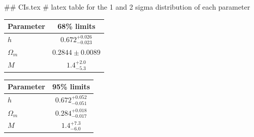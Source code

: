 ## CIs.tex
# latex table for the 1 and 2 sigma distribution of each parameter

\begin{tabular} { l  c}
 Parameter &  68\% limits\\
\hline
{\boldmath$h              $} & $0.672^{+0.026}_{-0.023}   $\\
{\boldmath$\Omega_m       $} & $0.2844\pm 0.0089          $\\
{\boldmath$M              $} & $1.4^{+2.0}_{-5.3}         $\\
\hline
\end{tabular}

\begin{tabular} { l  c}
 Parameter &  95\% limits\\
\hline
{\boldmath$h              $} & $0.672^{+0.052}_{-0.051}   $\\
{\boldmath$\Omega_m       $} & $0.284^{+0.018}_{-0.017}   $\\
{\boldmath$M              $} & $1.4^{+7.3}_{-6.0}         $\\
\hline
\end{tabular}
